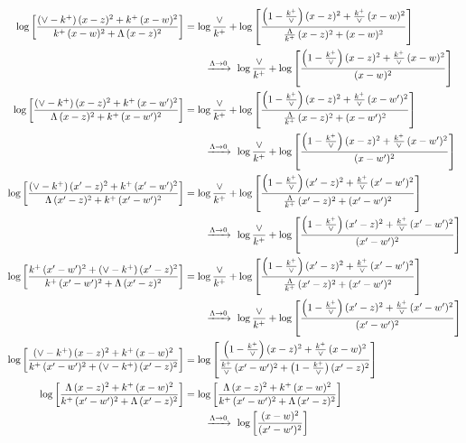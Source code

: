 \documentclass[10pt]{article}
\numberwithin{equation}{section}
\begin{document}
\begin{align}
\log{\left[\frac{(\vee-k^{+})\,(x-z)^{2}+k^{+}\,(x-w)^{2}}{k^{+}\,(x-w)^{2}+\Lambda\, (x-z)^{2}}\right]} &= \log\frac{\vee}{k^+} + \log{\left[\frac{\left(1-\frac{k^{+}}{\vee}\right)(x-z)^{2}+\frac{k^{+}}{\vee}\,(x-w)^{2}}{\frac{\Lambda}{k^{+}}\,(x-z)^{2}+(x-w)^{2}}\right]}\notag\\&\qquad\xrightarrow{\Lambda\to0}\ \log\frac{\vee}{k^+} + \log{\left[\frac{\left(1-\frac{k^{+}}{\vee}\right)(x-z)^{2}+\frac{k^{+}}{\vee}\,(x-w)^{2}}{(x-w)^{2}}\right]} \notag\\
\log{\left[\frac{(\vee-k^{+})\,(x-z)^{2}+k^{+}\,(x-w')^{2}}{\Lambda\, (x-z)^{2} + k^{+}\,(x-w')^{2}}\right]} &= \log\frac{\vee}{k^+} + \log{\left[\frac{\left(1-\frac{k^{+}}{\vee}\right)(x-z)^{2}+\frac{k^{+}}{\vee}\,(x-w')^{2}}{\frac{\Lambda}{k^{+}}\,(x-z)^{2}+(x-w')^{2}}\right]}\notag\\&\qquad\xrightarrow{\Lambda\to0}\ \log\frac{\vee}{k^+} + \log{\left[\frac{\left(1-\frac{k^{+}}{\vee}\right)(x-z)^{2}+\frac{k^{+}}{\vee}\,(x-w')^{2}}{(x-w')^{2}}\right]} \notag\\
\log{\left[\frac{(\vee-k^{+})\,(x'-z)^{2}+k^{+}\,(x'-w')^{2}}{\Lambda\,(x'-z)^{2}+k^{+}\,(x'-w')^{2}}\right]} &= \log\frac{\vee}{k^+} + \log{\left[\frac{\left(1-\frac{k^{+}}{\vee}\right)(x'-z)^{2}+\frac{k^{+}}{\vee}\,(x'-w')^{2}}{\frac{\Lambda}{k^{+}}\,(x'-z)^{2}+(x'-w')^{2}}\right]}\notag\\&\qquad\xrightarrow{\Lambda\to0}\ \log\frac{\vee}{k^+} + \log{\left[\frac{\left(1-\frac{k^{+}}{\vee}\right)(x'-z)^{2}+\frac{k^{+}}{\vee}\,(x'-w')^{2}}{(x'-w')^{2}}\right]} \notag\\
\log{\left[\frac{k^{+}\, (x'-w')^{2} + (\vee - k^{+})\, (x'-z)^{2}}{k^{+}\, (x'-w')^{2} + \Lambda\, (x'-z)^{2}}\right]} &= \log\frac{\vee}{k^+} + \log{\left[\frac{\left(1-\frac{k^{+}}{\vee}\right)(x'-z)^{2}+\frac{k^{+}}{\vee}\,(x'-w')^{2}}{\frac{\Lambda}{k^{+}}\,(x'-z)^{2}+(x'-w')^{2}}\right]}\notag\\&\qquad\xrightarrow{\Lambda\to0}\ \log\frac{\vee}{k^+} + \log{\left[\frac{\left(1-\frac{k^{+}}{\vee}\right)(x'-z)^{2}+\frac{k^{+}}{\vee}\,(x'-w')^{2}}{(x'-w')^{2}}\right]} \notag\\
\log{\left[\frac{(\vee-k^{+})\,(x-z)^{2}+k^{+}\,(x-w)^{2}}{k^{+}\, (x'-w')^{2} + (\vee-k^{+})\, (x'-z)^{2}}\right]} &= \log{\left[\frac{\left(1-\frac{k^{+}}{\vee}\right)(x-z)^{2}+\frac{k^{+}}{\vee}\,(x-w)^{2}}{\frac{k^{+}}{\vee}\, (x'-w')^{2} + \left(1-\frac{k^{+}}{\vee}\right) (x'-z)^{2}}\right]} \notag\\
\log{\left[\frac{\Lambda\,(x-z)^{2}+k^{+}\,(x-w)^{2}}{k^{+}\, (x'-w')^{2} + \Lambda\, (x'-z)^{2}}\right]} &= \log{\left[\frac{\Lambda\,(x-z)^{2}+k^{+}\,(x-w)^{2}}{k^{+}\, (x'-w')^{2} + \Lambda\, (x'-z)^{2}}\right]}\notag\\&\qquad\xrightarrow{\Lambda\to0}\ \log{\left[\frac{(x-w)^{2}}{(x'-w')^{2}}\right]}
\end{align}
\end{document}
